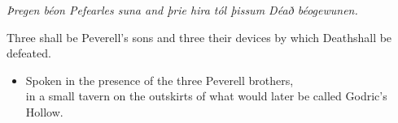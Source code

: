 \replacement{\sbreak}{}

\emph{Þregen béon Pefearles suna and þrie hira tól þissum Déað béogewunen.}

Three shall be Peverell's sons and three their devices by which Deathshall be defeated.

\begin{itemize}\itemsep1pt\parskip0pt\item  Spoken in the presence of the three Peverell brothers,\\ in a small tavern on the outskirts of what would later be called Godric's Hollow.\end{itemize}